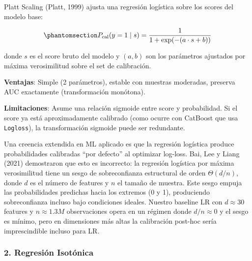 \documentclass[
  spanish,
  11pt,
  letterpaper,
]{scrbook}
\theoremstyle{plain}
\theoremstyle{remark}
\begin{document}
Platt Scaling (Platt, 1999) ajusta una regresión logística sobre los
scores del modelo base:

\begin{equation}\protect\phantomsection\label{eq-platt-scaling}{
P_{\text{cal}}(y=1 \mid s) = \frac{1}{1 + \exp(-(a \cdot s + b))}
}\end{equation}

donde \(s\) es el score bruto del modelo y \((a, b)\) son los parámetros
ajustados por máxima verosimilitud sobre el set de calibración.

\textbf{Ventajas}: Simple (2 parámetros), estable con muestras
moderadas, preserva AUC exactamente (transformación monótona).

\textbf{Limitaciones}: Asume una relación sigmoide entre score y
probabilidad. Si el score ya está aproximadamente calibrado (como ocurre
con CatBoost que usa \texttt{Logloss}), la transformación sigmoide puede
ser redundante.

\begin{tcolorbox}[enhanced jigsaw, arc=.35mm, bottomrule=.15mm, bottomtitle=1mm, breakable, colback=white, colbacktitle=quarto-callout-note-color!10!white, colframe=quarto-callout-note-color-frame, coltitle=black, left=2mm, leftrule=.75mm, opacityback=0, opacitybacktitle=0.6, rightrule=.15mm, title=\textcolor{quarto-callout-note-color}{\faInfo}\hspace{0.5em}{Nota: la regresión logística no está ``naturalmente calibrada''}, titlerule=0mm, toprule=.15mm, toptitle=1mm]

Una creencia extendida en ML aplicado es que la regresión logística
produce probabilidades calibradas ``por defecto'' al optimizar log-loss.
Bai, Lee y Liang (2021) demostraron que esto es incorrecto: la regresión
logística por máxima verosimilitud tiene un sesgo de sobreconfianza
estructural de orden \(\Theta(d/n)\), donde \(d\) es el número de
features y \(n\) el tamaño de muestra. Este sesgo empuja las
probabilidades predichas hacia los extremos (0 y 1), produciendo
sobreconfianza incluso bajo condiciones ideales. Nuestro baseline LR con
\(d \approx 30\) features y \(n \approx 1.3M\) observaciones opera en un
régimen donde \(d/n \approx 0\) y el sesgo es mínimo, pero en
dimensiones más altas la calibración post-hoc sería imprescindible
incluso para LR.

\end{tcolorbox}

\subsubsection{2. Regresión Isotónica}\label{regresiuxf3n-isotuxf3nica}
\end{document}
